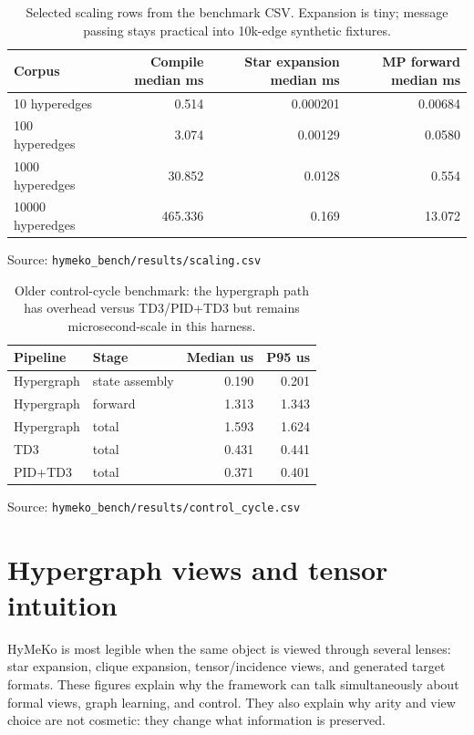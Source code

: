 \documentclass[10pt]{article}
\newcommand{\src}[1]{\par\footnotesize\textcolor{gray!70!black}{Source: \nolinkurl{#1}}\normalsize}
\begin{document}
\begin{table}[!htbp]\centering\small
\begin{tabular}{lrrr}
\toprule
Corpus & Compile median ms & Star expansion median ms & MP forward median ms \\
\midrule
10 hyperedges & 0.514 & 0.000201 & 0.00684 \\
100 hyperedges & 3.074 & 0.00129 & 0.0580 \\
1000 hyperedges & 30.852 & 0.0128 & 0.554 \\
10000 hyperedges & 465.336 & 0.169 & 13.072 \\
\bottomrule
\end{tabular}
\caption{Selected scaling rows from the benchmark CSV. Expansion is tiny; message
passing stays practical into 10k-edge synthetic fixtures.}
\src{hymeko_bench/results/scaling.csv}
\end{table}

\begin{table}[!htbp]\centering\small
\begin{tabular}{llrr}
\toprule
Pipeline & Stage & Median us & P95 us \\
\midrule
Hypergraph & state assembly & 0.190 & 0.201 \\
Hypergraph & forward & 1.313 & 1.343 \\
Hypergraph & total & 1.593 & 1.624 \\
TD3 & total & 0.431 & 0.441 \\
PID+TD3 & total & 0.371 & 0.401 \\
\bottomrule
\end{tabular}
\caption{Older control-cycle benchmark: the hypergraph path has overhead versus
TD3/PID+TD3 but remains microsecond-scale in this harness.}
\src{hymeko_bench/results/control_cycle.csv}
\end{table}

\section{Hypergraph views and tensor intuition}

HyMeKo is most legible when the same object is viewed through several lenses:
star expansion, clique expansion, tensor/incidence views, and generated target
formats. These figures explain why the framework can talk simultaneously about
formal views, graph learning, and control. They also explain why arity and view
choice are not cosmetic: they change what information is preserved.
\end{document}
